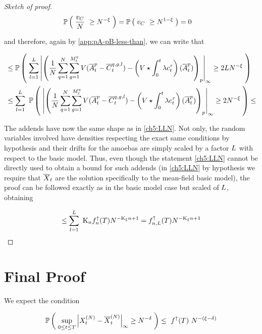 \begin{proof}[Sketch of proof]
	\begin{align*}
		\mathbb{P} \left( \; 
			\frac{v_C}{N}\
			\geq
			N^{-\xi}
		 \; \right) &= 
		\mathbb{P} \left( \; 
			v_C\
			\geq
			N^{1-\xi}
		 \; \right) = 0
	\end{align*}
	
	and therefore, again by \ref{app:pA-pB-less-than}, we can write that
	
	\begin{align*}
		&\leq
		\mathbb{P} \left( \; 
			\sum _{l = 1}^{L} 
			\left| 
				\left(
				\frac{1}{N} \sum _{q = 1}^{N} \sum_{g = 1}^{M_t^q} V(\overline{A}_t^p - \overline{C}_t^{q,g,l}) 
				-
				\left( V \star \int_0^t \lambda c_t^\tau \right) (\overline{A}_t^p)
				\right)_{p}
			 \right|_\infty
			\geq
			2L N^{-\xi}
		 \; \right)
		\\
		&\leq
		\sum _{l = 1}^{L}\
		\mathbb{P} \left( \; 
			\left| 
				\left(
				\frac{1}{N} \sum _{q = 1}^{N} \sum_{g = 1}^{M_t^q} V(\overline{A}_t^p - \overline{C}_t^{q,g,l}) 
				-
				\left( V \star \int_0^t \lambda c_t^\tau \right) (\overline{A}_t^p)
				\right)_{p}
			 \right|_\infty
			\geq
			2N^{-\xi}
		 \; \right)
		\leq
	\end{align*}
	
	The addends have now the same shape as in \ref{ch5:LLN}.
	Not only, the random variables involved have densities respecting the exact same conditions by hypothesis and their drifts for the amoebas are simply scaled by a factor $L$ with respect to the basic model.
	Thus, even though the statement \ref{ch5:LLN} cannot be directly used to obtain a bound for such addends (in \ref{ch5:LLN} by hypothesis we require that $\overline{X}_t$ are the solution specifically to the mean-field basic model), the proof can be followed exactly as in the basic model case but scaled of $L$, obtaining
	
	\begin{align*}
		\leq
		\sum _{l = 1}^{L}\
		\text{K}_{n}
		f^\uparrow_{n}(T)
		N^{-\text{K}_\xi n +1}
		=
		f^\uparrow_{n,L}(T)
		N^{-\text{K}_\xi n + 1}
	\end{align*}
\end{proof}

\section{Final Proof}

We expect the condition 

\begin{equation}\label{ch7:final-result}
	\mathbb{P} \left( \;   
		\sup_{0 \leq t \leq T}
		{ \left| 
			X_t^{(N)} - \overline{X}_t^{(N)}
		 \right|_{\infty} } 
		\geq
		N^{-\delta}
	 \; \right)
	\leq\
	f^\uparrow(T)\
	N^{-(\xi-\delta)}
\end{equation}

